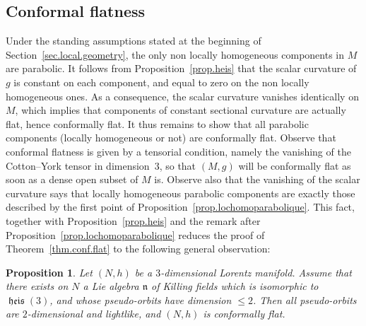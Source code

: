 \documentclass[11pt]{article}
\newtheorem{prop}[theo]{Proposition}
\theoremstyle{definition}
\numberwithin{equation}{section}
\numberwithin{figure}{section}
\numberwithin{table}{section}
\DeclareMathOperator{\heis}{{\mathfrak{heis}}}
\newcommand{\lien}{{\mathfrak{n}}}
\begin{document}
\subsection{Conformal flatness}\label{sec.conformal.flatness}
Under the standing assumptions stated at the beginning of Section~\ref{sec.local.geometry}, the only non locally homogeneous components in $M$ are parabolic. It follows from Proposition~\ref{prop.heis} that the scalar curvature of $g$ is constant on each component, and equal to zero on the non locally homogeneous ones. As a consequence, the scalar curvature vanishes identically on $M$, which implies that components of constant sectional curvature are actually flat, hence conformally flat. It thus remains to show that all parabolic components (locally homogeneous or not) are conformally flat. Observe that conformal flatness is given by a tensorial condition, namely the vanishing of the Cotton--York tensor in dimension~$3$, so that $(M,g)$ will be conformally flat as soon as a dense open subset of $M$ is. Observe also that the vanishing of the scalar curvature says that locally homogeneous parabolic components are exactly those described by the first point of Proposition~\ref{prop.lochomoparabolique}. This fact, together with Proposition~\ref{prop.heis} and the remark after Proposition~\ref{prop.lochomoparabolique} reduces the proof of Theorem~\ref{thm.conf.flat} to the following general observation:

\begin{prop}\label{prop.heisenberg.flat}
Let $(N,h)$ be a $3$-dimensional Lorentz manifold. Assume that there exists on $N$ a Lie algebra $\lien$ of Killing fields which is isomorphic to $\heis(3)$, and whose pseudo-orbits have dimension $\leq 2$. Then all pseudo-orbits are $2$-dimensional and lightlike, and $(N,h)$ is conformally flat.
\end{prop}
\end{document}
